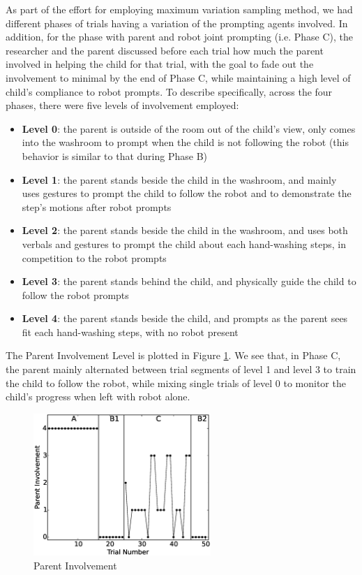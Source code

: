 As part of the effort for employing maximum variation sampling method, we had different phases of trials having a variation of the prompting agents involved.  In addition, for the phase with parent and robot joint prompting (i.e. Phase C), the researcher and the parent discussed before each trial how much the parent involved in helping the child for that trial, with the goal to fade out the involvement to minimal by the end of Phase C, while maintaining a high level of child's compliance to robot prompts.  To describe specifically, across the four phases, there were five levels of involvement employed:
\begin{itemize}
	\item \textbf{Level 0}: the parent is outside of the room out of the child's view, only comes into the washroom to prompt when the child is not following the robot (this behavior is similar to that during Phase B)
	\item \textbf{Level 1}: the parent stands beside the child in the washroom, and mainly uses gestures to prompt the child to follow the robot and to demonstrate the step's motions after robot prompts
	\item \textbf{Level 2}: the parent stands beside the child in the washroom, and uses both verbals and gestures to prompt the child about each hand-washing steps, in competition to the robot prompts
	\item \textbf{Level 3}: the parent stands behind the child, and physically guide the child to follow the robot prompts
	\item \textbf{Level 4}: the parent stands beside the child, and prompts as the parent sees fit each hand-washing steps, with no robot present
\end{itemize}
The Parent Involvement Level is plotted in Figure \ref{fig:6ParentInvolvement}.  We see that, in Phase C, the parent mainly alternated between trial segments of level 1 and level 3 to train the child to follow the robot, while mixing single trials of level 0 to monitor the child's progress when left with robot alone.
\begin{figure} [h]
	\centering
	\includegraphics[width=0.6\textwidth]{./img/data_analysis/6ParentInvolvement.eps}
	\caption{Parent Involvement}
	\label{fig:6ParentInvolvement}
\end{figure}

